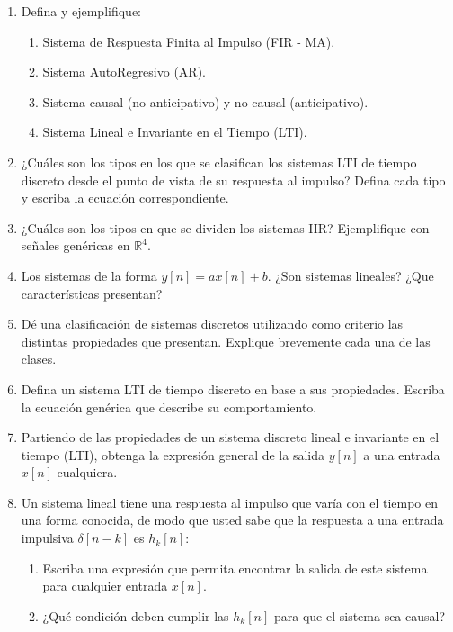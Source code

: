 \documentclass[a4paper,10pt,spanish]{article}
\begin{document}
\begin{enumerate}
\item Defina y ejemplifique:
	\begin{enumerate}
	\item Sistema de Respuesta Finita al Impulso (FIR - MA).
	\item Sistema AutoRegresivo (AR).
	\item Sistema causal (no anticipativo) y no causal (anticipativo).
	\item Sistema Lineal e Invariante en el Tiempo (LTI).
	\end{enumerate}
	
\item ¿Cuáles son los tipos en los que se clasifican los sistemas LTI de tiempo discreto desde el punto de vista de su respuesta al impulso? Defina cada tipo y escriba la ecuación correspondiente.

\item  ¿Cuáles son los tipos en que se dividen los sistemas IIR? Ejemplifique con señales genéricas en $\mathbb{R}^{4}$.

\item Los sistemas de la forma $y[n]=ax[n]+b$. ¿Son sistemas lineales? ¿Que características presentan?

\item Dé una clasificación de sistemas discretos utilizando como criterio las distintas propiedades que presentan. Explique brevemente cada una de las clases.

\item  Defina un sistema LTI de tiempo discreto en base a sus propiedades. Escriba la ecuación genérica que describe su comportamiento.

\item Partiendo de las propiedades de un sistema discreto lineal e invariante en el tiempo (LTI), obtenga la expresión general de la salida $y[n]$ a una entrada $x[n]$ cualquiera.

\item Un sistema lineal tiene una respuesta al impulso que varía con el tiempo en una forma conocida, de modo que usted sabe que la respuesta a una entrada impulsiva $\delta[n-k]$ es $h_{k}[n]$:
	\begin{enumerate}
	\item Escriba una expresión que permita encontrar la salida de este sistema para 		cualquier entrada $x[n]$.
	\item ¿Qué condición deben cumplir las $h_{k}[n]$ para que el sistema sea causal?
	\end{enumerate}

\end{enumerate}
\end{document}
